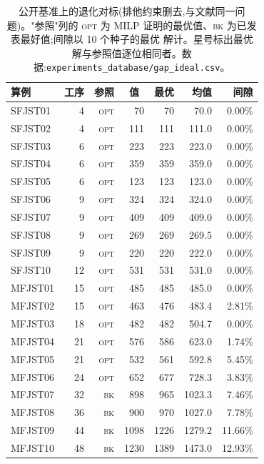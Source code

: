 \documentclass[manuscript,screen,review]{acmart}
\newcommand{\NSeeds}{10}
\begin{document}
\begin{table}[t]
\caption{公开基准上的退化对标(排他约束删去,与文献同一问题)。"参照"列的
\textsc{opt} 为 MILP 证明的最优值、\textsc{bk} 为已发表最好值;间隙以 \NSeeds{} 个种子的最优
解计。星号标出最优解与参照值逐位相同者。数据:\texttt{experiments\_database/gap\_ideal.csv}。}
\label{tab:external}
\centering
\small
\begin{tabular}{lrrrrrr}
\toprule
算例 & 工序 & 参照 & \multicolumn{1}{c}{值} & 最优 & 均值 & 间隙 \\
\midrule
SFJST01 & 4 & \textsc{opt} & 70 & 70\rlap{$^*$} & 70.0 & 0.00\% \\
SFJST02 & 4 & \textsc{opt} & 111 & 111\rlap{$^*$} & 111.0 & 0.00\% \\
SFJST03 & 6 & \textsc{opt} & 223 & 223\rlap{$^*$} & 223.0 & 0.00\% \\
SFJST04 & 6 & \textsc{opt} & 359 & 359\rlap{$^*$} & 359.0 & 0.00\% \\
SFJST05 & 6 & \textsc{opt} & 123 & 123\rlap{$^*$} & 123.0 & 0.00\% \\
SFJST06 & 9 & \textsc{opt} & 324 & 324\rlap{$^*$} & 324.0 & 0.00\% \\
SFJST07 & 9 & \textsc{opt} & 409 & 409\rlap{$^*$} & 409.0 & 0.00\% \\
SFJST08 & 9 & \textsc{opt} & 269 & 269\rlap{$^*$} & 269.5 & 0.00\% \\
SFJST09 & 9 & \textsc{opt} & 220 & 220\rlap{$^*$} & 222.0 & 0.00\% \\
SFJST10 & 12 & \textsc{opt} & 531 & 531\rlap{$^*$} & 531.0 & 0.00\% \\
MFJST01 & 15 & \textsc{opt} & 485 & 485\rlap{$^*$} & 485.0 & 0.00\% \\
MFJST02 & 15 & \textsc{opt} & 463 & 476 & 483.4 & 2.81\% \\
MFJST03 & 18 & \textsc{opt} & 482 & 482\rlap{$^*$} & 504.7 & 0.00\% \\
MFJST04 & 21 & \textsc{opt} & 576 & 586 & 623.0 & 1.74\% \\
MFJST05 & 21 & \textsc{opt} & 532 & 561 & 592.8 & 5.45\% \\
MFJST06 & 24 & \textsc{opt} & 652 & 677 & 728.3 & 3.83\% \\
MFJST07 & 32 & \textsc{bk} & 898 & 965 & 1023.3 & 7.46\% \\
MFJST08 & 36 & \textsc{bk} & 900 & 970 & 1027.0 & 7.78\% \\
MFJST09 & 44 & \textsc{bk} & 1098 & 1226 & 1279.2 & 11.66\% \\
MFJST10 & 48 & \textsc{bk} & 1230 & 1389 & 1473.0 & 12.93\% \\
\bottomrule
\end{tabular}
\end{table}
\end{document}
